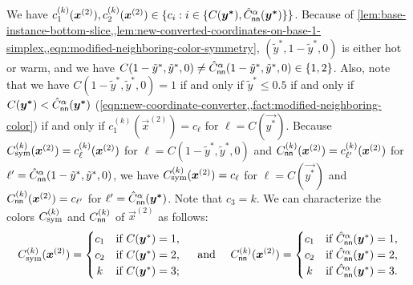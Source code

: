 \begin{itemize}[itemsep=0.2em, topsep=0.5em]
    We have $c^{(k)}_1(\vec{x}^{(2)}), c^{(k)}_2(\vec{x}^{(2)}) \in \{c_i: i\in \{C(\vec{y^*}), \hat{C}_{\sf nn}^{\alpha}(\vec{y^*})\}\}$.
    Because of \cref{lem:base-instance-bottom-slice,,lem:new-converted-coordinates-on-base-1-simplex,,eqn:modified-neighboring-color-symmetry},
    $(\tilde{y}^*, 1-\tilde{y}^*, 0)$ is either hot or warm, and we have $C(1-\tilde{y}^*,\tilde{y}^*,0) \neq \hat{C}^{\alpha}_{\sf nn}(1-\tilde{y}^*,\tilde{y}^*,0) \in \{1,2\}$. 
    Also, note that we have $C(1-\tilde{y}^*,\tilde{y}^*,0)=1$ if and only if $\tilde{y}^*\leq 0.5$ if and only if $C(\vec{y^*})<\hat{C}_{\sf nn}^{\alpha}(\vec{y^*})$ (\cref{eqn:new-coordinate-converter,,fact:modified-neighboring-color}) if and only if $c_1^{(k)}(\vec{x}^{(2)})=c_\ell$ for $\ell=C(\vec{y^*})$. 
    Because $\Csym{k}(\vec{x}^{(2)})=c_{\ell}^{(k)}(\vec{x}^{(2)})$ for $\ell=C(1-\tilde{y}^*,\tilde{y}^*,0)$ and $C^{(k)}_{\sf nn}(\vec{x}^{(2)})=c_{\ell'}^{(k)}(\vec{x}^{(2)})$ for $\ell'=\hat{C}^{\alpha}_{\sf nn}(1-\tilde{y}^*,\tilde{y}^*,0)$, we have $\Csym{k}(\vec{x}^{(2)})=c_{\ell}$ for $\ell=C(\vec{y^*})$ and $C^{(k)}_{\sf nn}(\vec{x}^{(2)})=c_{\ell'}$ for $\ell'=\hat{C}_{\sf nn}^{\alpha}(\vec{y^*})$.
    Note that $c_3=k$.
    We can characterize the colors $\Csym{k}$ and $C^{(k)}_{\sf nn}$ of $\vec{x}^{(2)}$ as follows:
    \begin{align}
        \label{eqn:colors-of-x2-on-symmetry-gc2}
        \Csym{k}(\vec{x}^{(2)}) = \begin{cases}
            \hfill c_1 \hfill  & \text{if $C(\vec{y}^*)=1$,} \\
            \hfill c_2 \hfill & \text{if $C(\vec{y}^*)=2$,} \\
            \hfill k \hfill & \text{if $C(\vec{y}^*)=3$;}
        \end{cases}
        \quad
        \text{ and }
        \quad 
        C_{\sf nn}^{(k)}(\vec{x}^{(2)}) = \begin{cases}
            \hfill c_1 \hfill  & \text{if $\hat{C}^{\alpha}_{\sf nn}(\vec{y}^*)=1$,} \\
            \hfill c_2 \hfill & \text{if $\hat{C}^{\alpha}_{\sf nn}(\vec{y}^*)=2$,} \\
            \hfill k \hfill & \text{if $\hat{C}^{\alpha}_{\sf nn}(\vec{y}^*)=3$.}
        \end{cases}
    \end{align}
\end{itemize}

